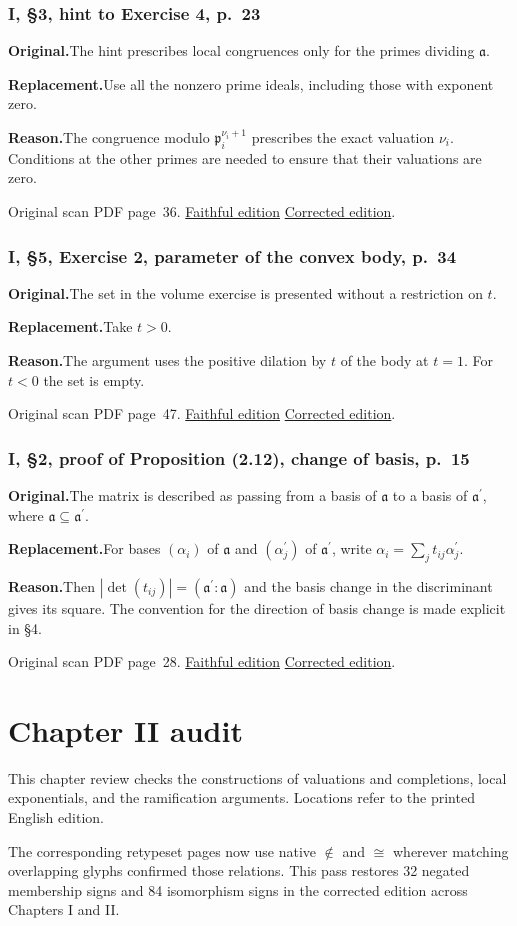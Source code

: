 \documentclass[11pt,a4paper]{article}
\newcommand{\original}{\par\smallskip\noindent\textbf{Original.}\enspace}
\newcommand{\replacement}{\par\smallskip\noindent\textbf{Replacement.}\enspace}
\newcommand{\reason}{\par\smallskip\noindent\textbf{Reason.}\enspace}
\newcommand{\editionlink}[3]{\href{#1\#errata.#2}{#3}}
\newcommand{\location}[2]{%
  \par\smallskip\noindent Original scan PDF page~#2.\enspace
  \editionlink{Neukirch_Faithful.pdf}{#1}{Faithful edition}
  \quad\editionlink{Neukirch_Corrected.pdf}{#1}{Corrected edition}.}
\begin{document}
\setcounter{section}{68}
\section{I, \S3, hint to Exercise 4, p.~23}\label{errata:item:69}

\original The hint prescribes local congruences only for the primes dividing $\mathfrak a$.
\replacement Use all the nonzero prime ideals, including those with exponent zero.
\reason The congruence modulo $\mathfrak p_i^{\nu_i+1}$ prescribes the exact valuation $\nu_i$. Conditions at the other primes are needed to ensure that their valuations are zero.
\location{69}{36}

\setcounter{section}{69}
\section{I, \S5, Exercise 2, parameter of the convex body, p.~34}\label{errata:item:70}

\original The set in the volume exercise is presented without a restriction on $t$.
\replacement Take $t>0$.
\reason The argument uses the positive dilation by $t$ of the body at $t=1$. For $t<0$ the set is empty.
\location{70}{47}

\setcounter{section}{70}
\section{I, \S2, proof of Proposition (2.12), change of basis, p.~15}\label{errata:item:71}

\original The matrix is described as passing from a basis of $\mathfrak a$ to a basis of $\mathfrak a^{\prime}$, where $\mathfrak a\subseteq\mathfrak a^{\prime}$.
\replacement For bases $(\alpha_i)$ of $\mathfrak a$ and $(\alpha_j^{\prime})$ of $\mathfrak a^{\prime}$, write $\alpha_i=\sum_jt_{ij}\alpha_j^{\prime}$.
\reason Then $|\det(t_{ij})|=(\mathfrak a^{\prime}:\mathfrak a)$ and the basis change in the discriminant gives its square. The convention for the direction of basis change is made explicit in \S4.
\location{71}{28}


\clearpage
\part{Chapter II audit}
This chapter review checks the constructions of valuations and completions, local exponentials, and the ramification arguments. Locations refer to the printed English edition.\par The corresponding retypeset pages now use native \(\notin\) and \(\cong\) wherever matching overlapping glyphs confirmed those relations. This pass restores 32 negated membership signs and 84 isomorphism signs in the corrected edition across Chapters I and II.
\setcounter{section}{71}
\end{document}
